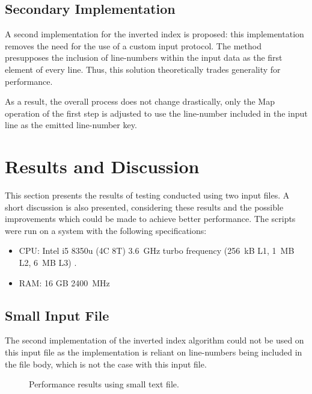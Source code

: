 \documentclass[journal,10pt]{IEEEtran}
\begin{document}
\subsection{Secondary Implementation}
A second implementation for the inverted index is proposed: this implementation removes the need for the use of a custom input protocol. The method presupposes the inclusion of line-numbers within the input data as the first element of every line. Thus, this solution theoretically trades generality for performance.

As a result, the overall process does not change drastically, only the Map operation of the first step is adjusted to use the line-number included in the input line as the emitted line-number key.
\clearpage
\section{Results and Discussion}

This section presents the results of testing conducted using two input files. A short discussion is also presented, considering these results and the possible improvements which could be made to achieve better performance. The scripts were run on a system with the following specifications:

\begin{itemize}
    \item CPU: Intel i5 8350u (4C 8T) 3.6~GHz turbo frequency (256~kB L1, 1~MB L2, 6~MB L3) \cite{8350u}.
    \item RAM: 16 GB \@ 2400~MHz
\end{itemize}

\subsection{Small Input File}

The second implementation of the inverted index algorithm could not be used on this input file as the implementation is reliant on line-numbers being included in the file body, which is not the case with this input file.

\begin{figure}[H]
    \centering
    \caption{Performance results using small text file.}
    \label{fig:my_label}
\end{figure}
\end{document}
